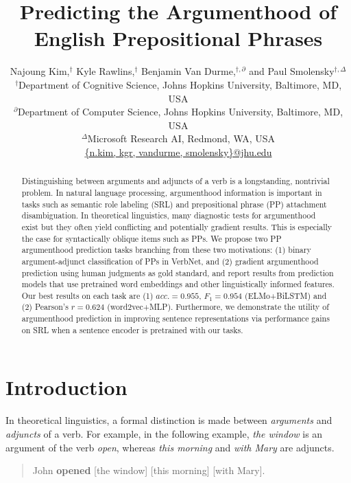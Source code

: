 \documentclass[letterpaper]{article} %
\title{Predicting the Argumenthood of English Prepositional Phrases}
\author{Najoung Kim,$^\dagger$ Kyle Rawlins,$^\dagger$ Benjamin Van Durme,$^{\dagger,\partial}$ and Paul Smolensky$^{\dagger,\Delta}$\\
$^\dagger$Department of Cognitive Science, Johns Hopkins University, Baltimore, MD, USA\\
$^\partial$Department of Computer Science, Johns Hopkins University, Baltimore, MD, USA \\
$^\Delta$Microsoft Research AI, Redmond, WA, USA\\
\url{{n.kim, kgr, vandurme, smolensky}@jhu.edu}}
\begin{document}
\maketitle
\begin{abstract}
Distinguishing between arguments and adjuncts of a verb is a longstanding, nontrivial problem. In natural language processing, argumenthood information is important in tasks such as semantic role labeling (SRL) and prepositional phrase (PP) attachment disambiguation. In theoretical linguistics, many diagnostic tests for argumenthood exist but they often yield conflicting and potentially gradient results. This is especially the case for syntactically oblique items such as PPs. We propose two PP argumenthood prediction tasks branching from these two motivations: (1) binary argument-adjunct classification of PPs in VerbNet, and (2) gradient argumenthood prediction using human judgments as gold standard, and report results from prediction models that use pretrained word embeddings and other linguistically informed features. Our best results on each task are (1) $acc.=0.955$, $F_1=0.954$ (ELMo+BiLSTM) and (2) Pearson's $r=0.624$ (word2vec+MLP). Furthermore, we demonstrate the utility of argumenthood prediction in improving sentence representations via performance gains on SRL when a sentence encoder is pretrained with our tasks.
\end{abstract}

\section{Introduction}

In theoretical linguistics, a formal distinction is made between \textit{arguments} and \textit{adjuncts} of a verb. For example, in the following example, \textit{the window} is an argument of the verb \textit{open}, whereas \textit{this morning} and \textit{with Mary} are adjuncts.

\begin{quote}
John \textbf{opened} [the window] [this morning] [with Mary].
\end{quote}
\end{document}
